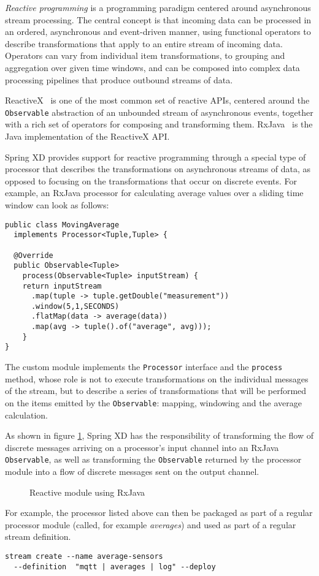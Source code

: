 \emph{Reactive programming} is a programming paradigm centered around asynchronous
stream processing. The central concept is that incoming data can be processed in an
ordered, asynchronous and event-driven manner, using functional operators to describe
transformations that apply to an entire stream of incoming data. Operators can
vary from individual item transformations, to grouping and aggregation over given
time windows, and can be composed into complex data processing pipelines that produce
outbound streams of data.

ReactiveX~\cite{reactivex} is one of the most common set of reactive APIs, centered around
the \texttt{Observable} abstraction of an unbounded stream of asynchronous events,
together with a rich set of operators for composing and transforming them.
RxJava~\cite{rxjava} is the Java implementation of the ReactiveX API.

Spring XD provides support for reactive programming through a special type of
processor that describes the transformations on asynchronous streams of data, as
opposed to focusing on the transformations that occur on discrete events. For example,
an RxJava processor for calculating average values over a sliding time window can look as follows:

\begin{lstlisting}
public class MovingAverage
  implements Processor<Tuple,Tuple> {

  @Override
  public Observable<Tuple>
    process(Observable<Tuple> inputStream) {
    return inputStream
      .map(tuple -> tuple.getDouble("measurement"))
      .window(5,1,SECONDS)
      .flatMap(data -> average(data))
      .map(avg -> tuple().of("average", avg)));
    }
}
\end{lstlisting}

The custom module implements the \texttt{Processor} interface and the
\texttt{process} method, whose role is not to execute transformations
on the individual messages of the stream, but to describe a series of
transformations that will be performed on the items emitted by the
\texttt{Observable}: mapping, windowing and the average calculation.

As shown in figure \ref{fig:rxjava}, Spring XD has the responsibility of transforming the
flow of discrete messages arriving on a processor's input channel into an
RxJava \texttt{Observable}, as well as transforming the \texttt{Observable}
returned by the processor module into a flow of discrete messages sent on
the output channel.

\begin{figure}[ht]
\centering
{}
\caption{Reactive module using RxJava}
\label{fig:rxjava}
\end{figure}

For example, the processor listed above can then be packaged as part of a regular
 processor module (called, for example \emph{averages}) and used as part of a
 regular stream definition.

\begin{lstlisting}
stream create --name average-sensors
  --definition  "mqtt | averages | log" --deploy
\end{lstlisting}
